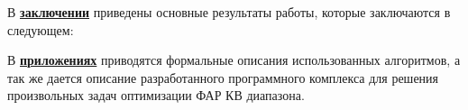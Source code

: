 \FloatBarrier
{}                                  %
В \underline{\textbf{заключении}} приведены основные результаты работы, которые заключаются в следующем:


В \underline{\textbf{приложениях}} приводятся формальные описания использованных алгоритмов, а так же дается описание разработанного программного комплекса для решения произвольных задач оптимизации ФАР КВ диапазона.




